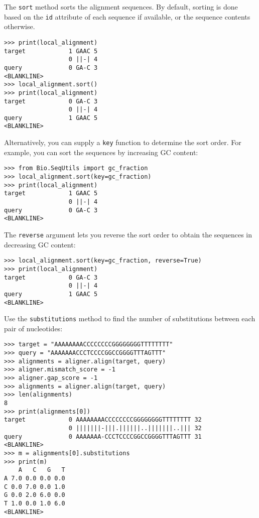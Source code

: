 The \verb+sort+ method sorts the alignment sequences. By default, sorting is done based on the \verb+id+ attribute of each sequence if available, or the sequence contents otherwise.
\begin{verbatim}
>>> print(local_alignment)
target            1 GAAC 5
                  0 ||-| 4
query             0 GA-C 3
<BLANKLINE>
>>> local_alignment.sort()
>>> print(local_alignment)
target            0 GA-C 3
                  0 ||-| 4
query             1 GAAC 5
<BLANKLINE>
\end{verbatim}
Alternatively, you can supply a \verb+key+ function to determine the sort order. For example, you can sort the sequences by increasing GC content:
\begin{verbatim}
>>> from Bio.SeqUtils import gc_fraction
>>> local_alignment.sort(key=gc_fraction)
>>> print(local_alignment)
target            1 GAAC 5
                  0 ||-| 4
query             0 GA-C 3
<BLANKLINE>
\end{verbatim}
The \verb+reverse+ argument lets you reverse the sort order to obtain the sequences in decreasing GC content:
\begin{verbatim}
>>> local_alignment.sort(key=gc_fraction, reverse=True)
>>> print(local_alignment)
target            0 GA-C 3
                  0 ||-| 4
query             1 GAAC 5
<BLANKLINE>
\end{verbatim}

Use the \verb+substitutions+ method to find the number of substitutions between each pair of nucleotides:
\begin{verbatim}
>>> target = "AAAAAAAACCCCCCCCGGGGGGGGTTTTTTTT"
>>> query = "AAAAAAACCCTCCCCGGCCGGGGTTTAGTTT"
>>> alignments = aligner.align(target, query)
>>> aligner.mismatch_score = -1
>>> aligner.gap_score = -1
>>> alignments = aligner.align(target, query)
>>> len(alignments)
8
>>> print(alignments[0])
target            0 AAAAAAAACCCCCCCCGGGGGGGGTTTTTTTT 32
                  0 |||||||-|||.||||||..|||||||..||| 32
query             0 AAAAAAA-CCCTCCCCGGCCGGGGTTTAGTTT 31
<BLANKLINE>
>>> m = alignments[0].substitutions
>>> print(m)
    A   C   G   T
A 7.0 0.0 0.0 0.0
C 0.0 7.0 0.0 1.0
G 0.0 2.0 6.0 0.0
T 1.0 0.0 1.0 6.0
<BLANKLINE>
\end{verbatim}

